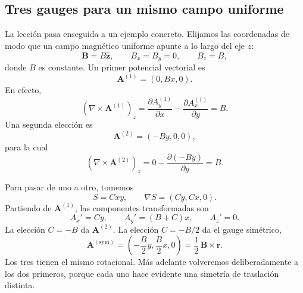 \subsection{Tres gauges para un mismo campo uniforme}

La lección pasa enseguida a un ejemplo concreto. Elijamos las coordenadas de modo que un campo magnético uniforme apunte a lo largo del eje \(z\):
\begin{equation}
  \mathbf B=B\hat{\mathbf z},
  \qquad
  B_x=B_y=0,
  \qquad
  B_z=B,
\end{equation}
donde \(B\) es constante. Un primer potencial vectorial es
\begin{equation}
  \mathbf A^{(1)}=(0,Bx,0).
\end{equation}
En efecto,
\begin{equation}
  (\nabla\times\mathbf A^{(1)})_z
  =
  \frac{\partial A_y^{(1)}}{\partial x}
  -
  \frac{\partial A_x^{(1)}}{\partial y}
  =B.
\end{equation}
Una segunda elección es
\begin{equation}
  \mathbf A^{(2)}=(-By,0,0),
\end{equation}
para la cual
\begin{equation}
  (\nabla\times\mathbf A^{(2)})_z
  =
  0-\frac{\partial(-By)}{\partial y}
  =B.
\end{equation}

Para pasar de uno a otro, tomemos
\begin{equation}
  S=Cxy,
  \qquad
  \nabla S=(Cy,Cx,0).
\end{equation}
Partiendo de \(\mathbf A^{(1)}\), las componentes transformadas son
\begin{equation}
  A_x'=Cy,
  \qquad
  A_y'=(B+C)x,
  \qquad
  A_z'=0.
\end{equation}
La elección \(C=-B\) da \(\mathbf A^{(2)}\). La elección \(C=-B/2\) da el gauge simétrico,
\begin{equation}
  \mathbf A^{(\mathrm{sym})}
  =
  \left(-\frac{B}{2}y,\frac{B}{2}x,0\right)
  =
  \frac12\,\mathbf B\times\mathbf r.
\end{equation}
Los tres tienen el mismo rotacional. Más adelante volveremos deliberadamente a los dos primeros, porque cada uno hace evidente una simetría de traslación distinta.

\begin{classroomqa}
\end{classroomqa}

